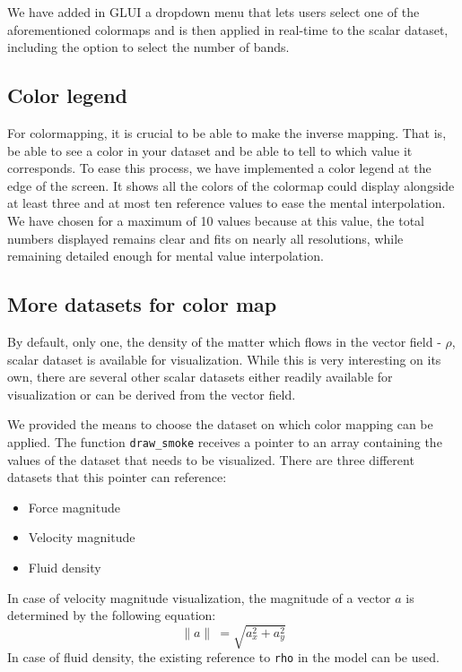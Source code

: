 		We have added in GLUI a dropdown menu that lets users select one of the aforementioned colormaps and is then applied in real-time to the scalar dataset, including the option to select the number of bands.
	\subsection{Color legend}
		For colormapping, it is crucial to be able to make the inverse mapping. 
		That is, be able to see a color in your dataset and be able to tell to which value it corresponds. 
		To ease this process, we have implemented a color legend at the edge of the screen. 
		It shows all the colors of the colormap could display alongside at least three and at most ten reference values to ease the mental interpolation. 
		We have chosen for a maximum of 10 values because at this value, the total numbers displayed remains clear and fits on nearly all resolutions, while remaining detailed enough for mental value interpolation.
	\subsection{More datasets for color map}
		By default, only one, the density of the matter which flows in the vector field - \(\rho\), scalar dataset is available for visualization. 
		While this is very interesting on its own, there are several other scalar datasets either readily available for visualization or can be derived from the vector field.

		We provided the means to choose the dataset on which color mapping can be applied.
		The function \texttt{draw\_smoke} receives a pointer to an array containing the values of the dataset that needs to be visualized.
		There are three different datasets that this pointer can reference:
		\begin{itemize}
			\item Force magnitude
			\item Velocity magnitude
			\item Fluid density
		\end{itemize}
		In case of velocity magnitude visualization, the magnitude of a vector \(a\) is determined by the following equation:
		\[\| a \|\ = \sqrt{a_x^2 + a_y^2}\]
		In case of fluid density, the existing reference to \texttt{rho} in the model can be used.
